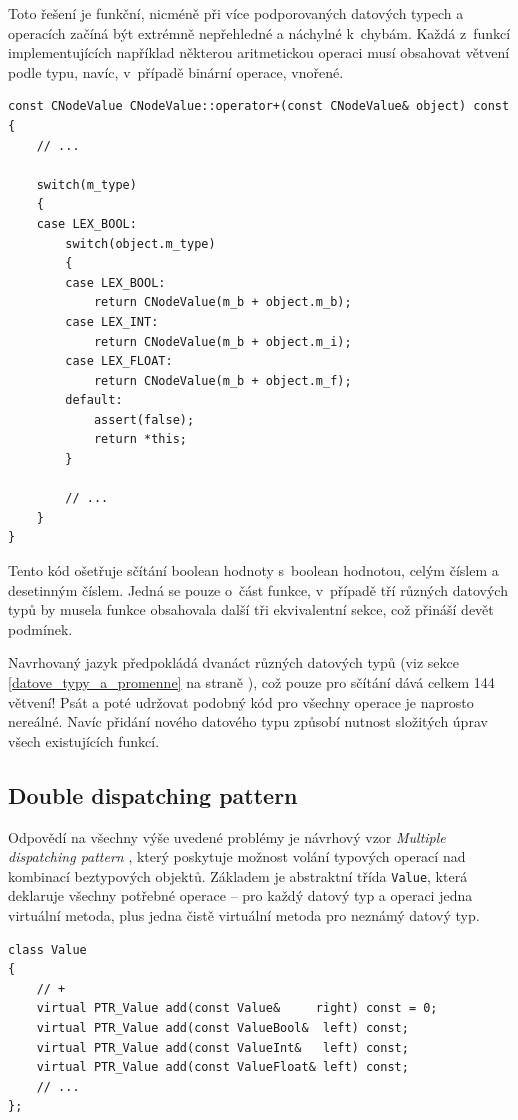 \documentclass[11pt,twoside,a4paper]{book}
\begin{document}
Toto řešení je funkční, nicméně při více podporovaných datových typech a operacích začíná být extrémně nepřehledné a náchylné k~chybám. Každá z~funkcí implementujících například některou aritmetickou operaci musí obsahovat větvení podle typu, navíc, v~případě binární operace, vnořené.

\begin{verbatim}
const CNodeValue CNodeValue::operator+(const CNodeValue& object) const
{
    // ...

    switch(m_type)
    {
    case LEX_BOOL:
        switch(object.m_type)
        {
        case LEX_BOOL:
            return CNodeValue(m_b + object.m_b);
        case LEX_INT:
            return CNodeValue(m_b + object.m_i);
        case LEX_FLOAT:
            return CNodeValue(m_b + object.m_f);
        default:
            assert(false);
            return *this;
        }

        // ...
    }
}
\end{verbatim}

Tento kód ošetřuje sčítání boolean hodnoty s~boolean hodnotou, celým číslem a desetinným číslem. Jedná se pouze o~část funkce, v~případě tří různých datových typů by musela funkce obsahovala další tři ekvivalentní sekce, což přináší devět podmínek.

Navrhovaný jazyk předpokládá dvanáct různých datových typů (viz sekce \ref{datove_typy_a_promenne} na straně \pageref{datove_typy_a_promenne}), což pouze pro sčítání dává celkem 144 větvení! Psát a poté udržovat podobný kód pro všechny operace je naprosto nereálné. Navíc přidání nového datového typu způsobí nutnost slo\-ži\-tých úprav všech existujících funkcí.


\subsection{Double dispatching pattern}
\label{double_dispatching_pattern}

Odpovědí na všechny výše uvedené problémy je návrhový vzor \textit{Multiple dispatching pattern} \cite[str. 679]{eckel}, který poskytuje možnost volání typových operací nad kombinací beztypových objektů. Základem je abstraktní třída \texttt{Value}, která deklaruje všechny potřebné operace -- pro každý datový typ a operaci jedna virtuální metoda, plus jedna čistě virtuální metoda pro neznámý datový typ.

\begin{verbatim}
class Value
{
    // +
    virtual PTR_Value add(const Value&     right) const = 0;
    virtual PTR_Value add(const ValueBool&  left) const;
    virtual PTR_Value add(const ValueInt&   left) const;
    virtual PTR_Value add(const ValueFloat& left) const;
    // ...
};
\end{verbatim}
\end{document}

